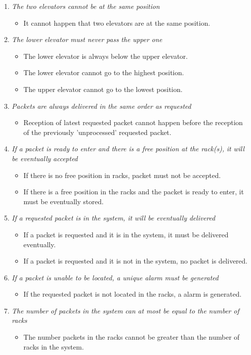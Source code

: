 \begin{enumerate}
\item \textit{The two elevators cannot be at the same position}
	\begin{itemize}
	\item  It cannot happen that two elevators are at the same 
	position.
	\end{itemize}	
	
\item \textit{The lower elevator must never pass the upper one}
	\begin{itemize}
	\item The lower elevator is always below the upper elevator.
	\item The lower elevator cannot go to the highest position.
	\item The upper elevator cannot go to the lowest position.
	\end{itemize}
	
\item \textit{Packets are always delivered in the same order as
	requested}	
	\begin{itemize}
	\item Reception of latest requested packet cannot happen before
	the reception of the previously 'unprocessed' requested packet.
	\end{itemize}
	
\item \textit{If a packet is ready to enter and there is a free
	position at the rack(s), it will be eventually accepted}
	\begin{itemize}
	\item If there is no free position in racks, packet must not be 
	accepted.
	\item If there is a free position in the racks and the packet is 
	ready to enter, it must be eventually stored.
	\end{itemize}
	
\item \textit{If a requested packet is in the system, it will be
	eventually delivered}
	\begin{itemize}
	\item If a packet is requested and it is in the system, it must be
	delivered eventually.
	\item If a packet is requested and it is not in the system, no 
	packet is delivered.
	\end{itemize}
	
\item \textit{If a packet is unable to be located, a unique alarm must 
	be generated}
	\begin{itemize}	
	\item If the requested packet is not located in the racks, a alarm
	is generated.
	\end{itemize}
		
\item \textit{The number of packets in the system can at most be equal to the number of racks}
	\begin{itemize}
	\item The number packets in the racks cannot be greater than the 
	number of racks in the system.
	\end{itemize}
\end{enumerate}

